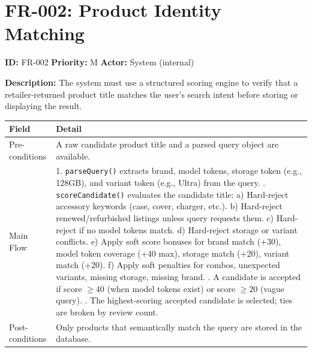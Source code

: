 \documentclass[12pt,a4paper]{report}
\begin{document}
\section{FR-002: Product Identity Matching}

\begin{reqbox}
\textbf{ID:} FR-002 \quad \textbf{Priority:} M \quad \textbf{Actor:} System (internal)
\end{reqbox}

\textbf{Description:} The system must use a structured scoring engine to
verify that a retailer-returned product title matches the user's search intent
before storing or displaying the result.

\begin{longtable}{L{3cm} L{10cm}}
  \toprule
  \textbf{Field} & \textbf{Detail} \\
  \midrule
  \endhead
  Pre-conditions & A raw candidate product title and a parsed query object are
                   available. \\[3pt]
  Main Flow &
    1. \texttt{parseQuery()} extracts brand, model tokens, storage token (e.g.,
       128GB), and variant token (e.g., Ultra) from the query. . \texttt{scoreCandidate()} evaluates the candidate title: \newline
       \quad a) Hard-reject accessory keywords (case, cover, charger, etc.). \newline
       \quad b) Hard-reject renewed/refurbished listings unless query requests
              them. \newline
       \quad c) Hard-reject if no model tokens match. \newline
       \quad d) Hard-reject storage or variant conflicts. \newline
       \quad e) Apply soft score bonuses for brand match (+30), model token
              coverage (+40 max), storage match (+20), variant match (+20). \newline
       \quad f) Apply soft penalties for combos, unexpected variants, missing
              storage, missing brand. . A candidate is accepted if score $\geq 40$ (when model tokens exist) or
       score $\geq 20$ (vague query). . The highest-scoring accepted candidate is selected; ties are broken by
       review count. \\[3pt]
  Post-conditions & Only products that semantically match the query are stored
                    in the database. \\
  \bottomrule
\end{longtable}
\end{document}
